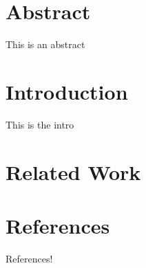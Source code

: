 \section{Abstract}
\label{sec:orgheadline1}
This is an abstract
\section{Introduction}
\label{sec:orgheadline2}
This is the intro
\section{Related Work}
\label{sec:orgheadline3}
\section{References}
\label{sec:orgheadline4}
References!
